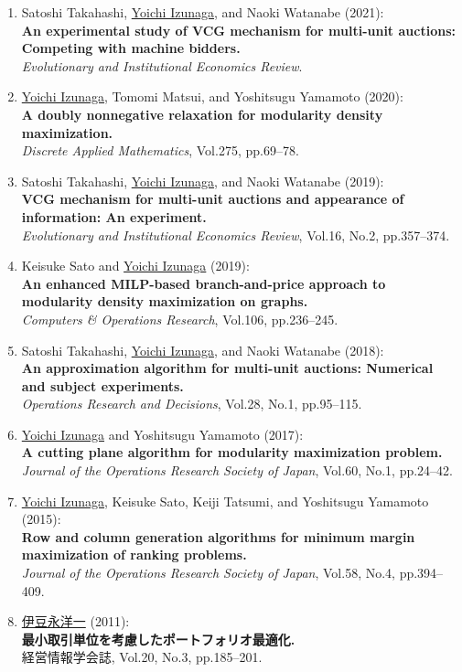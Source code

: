 \documentclass[a4j,uplatex,9pt]{jsarticle}
\begin{document}
\begin{enumerate}

\item Satoshi Takahashi, \underline{Yoichi Izunaga}, and Naoki Watanabe (2021):\\
{\bf An experimental study of VCG mechanism for multi-unit auctions: Competing with machine bidders.}\\
{\it Evolutionary and Institutional Economics Review}.

\item \underline{Yoichi Izunaga}, Tomomi Matsui, and Yoshitsugu Yamamoto (2020):\\
{\bf A doubly nonnegative relaxation for modularity density maximization.}\\
{\it Discrete Applied Mathematics}, Vol.275, pp.69--78.

\item Satoshi Takahashi, \underline{Yoichi Izunaga}, and Naoki Watanabe (2019):\\
{\bf VCG mechanism for multi-unit auctions and appearance of information: An experiment.}\\
{\it Evolutionary and Institutional Economics Review}, Vol.16, No.2, pp.357--374.

\item Keisuke Sato and \underline{Yoichi Izunaga} (2019):\\
{\bf An enhanced MILP-based branch-and-price approach to modularity density maximization on graphs.}\\
{\it Computers \& Operations Research}, Vol.106, pp.236--245.

\item Satoshi Takahashi, \underline{Yoichi Izunaga}, and Naoki Watanabe (2018):\\
{\bf An approximation algorithm for multi-unit auctions: Numerical and subject experiments.}\\
{\it Operations Research and Decisions}, Vol.28, No.1, pp.95--115.

\item \underline{Yoichi Izunaga} and Yoshitsugu Yamamoto (2017):\\
{\bf A cutting plane algorithm for modularity maximization problem.}\\
{\it Journal of the Operations Research Society of Japan}, Vol.60, No.1, pp.24--42.

\item \underline{Yoichi Izunaga}, Keisuke Sato, Keiji Tatsumi, and Yoshitsugu Yamamoto (2015):\\
{\bf Row and column generation algorithms for minimum margin maximization of ranking problems.}\\
{\it Journal of the Operations Research Society of Japan}, Vol.58, No.4, pp.394--409.

\item \underline{伊豆永洋一} (2011):\\
{\bf 最小取引単位を考慮したポートフォリオ最適化.}\\
経営情報学会誌, Vol.20, No.3, pp.185--201.

\end{enumerate}
\end{document}

